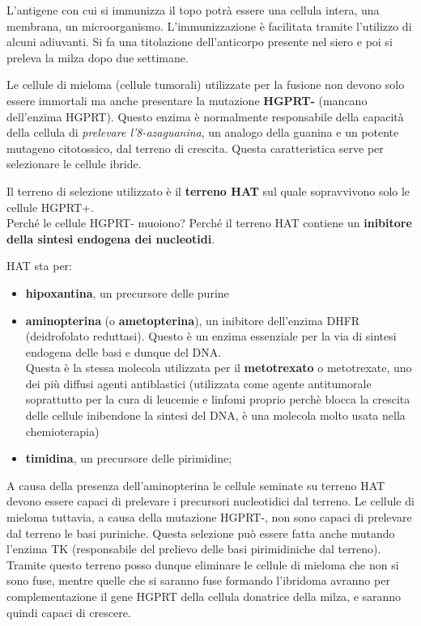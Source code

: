\documentclass[11pt]{book}
\begin{document}
L’antigene con cui si immunizza il topo potrà essere una cellula intera, una membrana, un microorganismo. L'immunizzazione è facilitata tramite l'utilizzo di alcuni adiuvanti. Si fa una titolazione dell’anticorpo presente nel siero e poi si preleva la milza dopo due settimane.

Le cellule di mieloma (cellule tumorali) utilizzate per la fusione non devono solo essere immortali ma anche presentare la mutazione \textbf{HGPRT-} (mancano dell’enzima HGPRT). Questo enzima è normalmente responsabile della capacità della cellula di \emph{prelevare l’8-azaguanina}, un analogo della guanina e un potente mutageno citotossico, dal terreno di crescita. Questa caratteristica serve per selezionare le cellule ibride.

Il terreno di selezione utilizzato è il \textbf{terreno HAT} sul quale sopravvivono solo le cellule HGPRT+.\\
Perché le cellule HGPRT- muoiono? Perché il terreno HAT contiene un \textbf{inibitore della sintesi endogena dei nucleotidi}. 

HAT sta per:
\begin{itemize}
\item \textbf{hipoxantina}, un precursore delle purine
\item \textbf{aminopterina} (o \textbf{ametopterina}), un inibitore dell'enzima DHFR (deidrofolato reduttasi). Questo è un enzima essenziale per la via di sintesi endogena delle basi e dunque del DNA.\\
Questa è la stessa molecola utilizzata per il \textbf{metotrexato} o metotrexate, uno dei più diffusi agenti antiblastici (utilizzata come agente antitumorale soprattutto per la cura di leucemie e linfomi proprio perchè blocca la crescita delle cellule inibendone la sintesi del DNA, è una molecola molto usata nella chemioterapia)
\item \textbf{timidina}, un precursore delle pirimidine; 
\end{itemize}

A causa della presenza dell'aminopterina le cellule seminate su terreno HAT devono essere capaci di prelevare i precursori nucleotidici dal terreno. Le cellule di mieloma tuttavia, a causa della mutazione HGPRT-, non sono capaci di prelevare dal terreno le basi puriniche. Questa selezione può essere fatta anche mutando l'enzima TK (responsabile del prelievo delle basi pirimidiniche dal terreno).\\
Tramite questo terreno posso dunque eliminare le cellule di mieloma che non si sono fuse, mentre quelle che si saranno fuse formando l’ibridoma avranno per complementazione il gene HGPRT della cellula donatrice della milza, e saranno quindi capaci di crescere.
\end{document}
